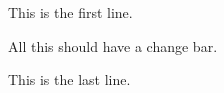 \documentclass{article}
\begin{document}
This is the first line.

\cbstart
All this should have a change bar.
\cbend

This is the last line.
\end{document}

